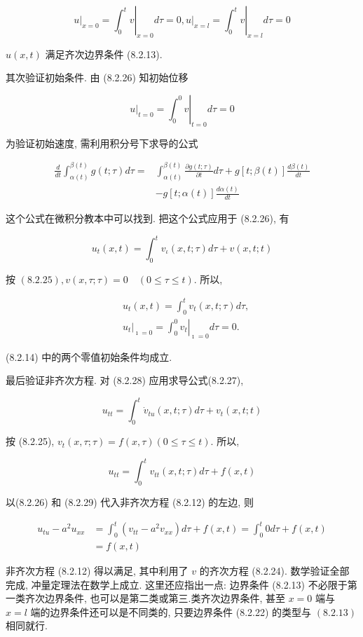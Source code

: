 $$
\left.u\right|_{x=0}=\left.\int_{0}^{t} v\right|_{x=0} d \tau=0,\left.u\right|_{x=l}=\left.\int_{0}^{t} v\right|_{x=l} d \tau=0
$$

$u(x, t)$ 满足齐次边界条件 (8.2.13).

其次验证初始条件. 由 (8.2.26) 知初始位移

$$
\left.u\right|_{t=0}=\left.\int_{0}^{0} v\right|_{t=0} d \tau=0
$$

为验证初始速度, 需利用积分号下求导的公式

$$
\begin{aligned}
\frac{d}{d t} \int_{\alpha(t)}^{\beta(t)} g(t ; \tau) d \tau= & \int_{\alpha(t)}^{\beta(t)} \frac{\partial g(t ; \tau)}{\partial t} d \tau+g[t ; \beta(t)] \frac{d \beta(t)}{d t} \\
& -g[t ; \alpha(t)] \frac{d \alpha(t)}{d t}
\end{aligned}
$$

这个公式在微积分教本中可以找到. 把这个公式应用于 (8.2.26), 有

$$
u_{t}(x, t)=\int_{0}^{t} v_{\iota}(x, t ; \tau) d \tau+v(x, t ; t)
$$

按 $(8.2 .25), v(x, \tau ; \tau)=0 \quad(0 \leqslant \tau \leqslant t)$. 所以,

$$
\begin{aligned}
& u_{t}(x, t)=\int_{0}^{t} v_{t}(x, t ; \tau) d \tau, \\
& \left.u_{t}\right|_{\imath=0}=\left.\int_{0}^{0} v_{t}\right|_{\imath=0} d \tau=0 .
\end{aligned}
$$

(8.2.14) 中的两个零值初始条件均成立.

最后验证非齐次方程. 对 (8.2.28) 应用求导公式(8.2.27),

$$
u_{t t}=\int_{0}^{t} \dot{v}_{t u}(x, t ; \tau) d \tau+v_{t}(x, t ; t)
$$

按 (8.2.25), $v_{t}(x, \tau ; \tau)=f(x, \tau)(0 \leqslant \tau \leqslant t)$. 所以,

$$
u_{t t}=\int_{0}^{t} v_{t t}(x, t ; \tau) d \tau+f(x, t)
$$

以(8.2.26) 和 (8.2.29) 代入非齐次方程 (8.2.12) 的左边, 则

$$
\begin{aligned}
u_{t u}-a^{2} u_{x x} & =\int_{0}^{t}\left(v_{t t}-a^{2} v_{x x}\right) d \tau+f(x, t)=\int_{0}^{t} 0 d \tau+f(x, t) \\
& =f(x, t)
\end{aligned}
$$

非齐次方程 (8.2.12) 得以满足, 其中利用了 $v$ 的齐次方程 (8.2.24).
数学验证全部完成, 冲量定理法在数学上成立. 这里还应指出一点: 边界条件 (8.2.13) 不必限于第一类齐次边界条件, 也可以是第二类或第三.类齐次边界条件, 甚至 $x=0$ 端与 $x=l$ 端的边界条件还可以是不同类的, 只要边界条件 (8.2.22) 的类型与 $(8.2 .13)$ 相同就行.

